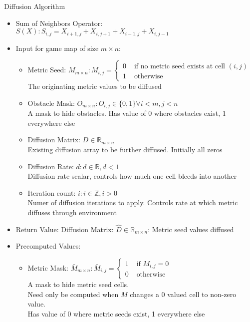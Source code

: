 \documentclass{beamer}
\begin{document}
\begin{frame}{Diffusion Algorithm}\fontsize{6pt}{7}\selectfont
 
 \begin{itemize}\fontsize{6pt}{7}\selectfont
  \item Sum of Neighbors Operator: \\$ S(X): S_{i,j} = X_{i+1,j} + X_{i,j+1} + X_{i-1,j} + X_{i,j-1} $
  \item Input for game map of size $m \times n$:
    \begin{itemize}\fontsize{6pt}{7}\selectfont
     \item Metric Seed: $M_{m \times n}: M_{i,j} = \left\{ \begin{array}{rl}
0 &\mbox{ if no metric seed exists at cell }(i,j) \\
1 &\mbox{ otherwise}
\end{array} \right.$ \\ The originating metric values to be diffused
     \item Obstacle Mask: $O_{m \times n}: O_{i,j} \in \{0,1\} \forall i<m, j<n$ \\ A mask to hide obstacles.  Has value of 0 where obstacles exist, 1 everywhere else
     \item Diffusion Matrix: $D\in \mathbb{R}_{m \times n}$ \\ Existing diffusion array to be further diffused.  Initially all zeros
     \item Diffusion Rate: $d: d \in \mathbb{R},  d < 1$ \\ Diffusion rate scalar, controls how much one cell bleeds into another
     \item Iteration count: $i: i \in \mathbb{Z}, i > 0$ \\ Numer of diffusion iterations to apply.  Controls rate at which metric diffuses through environment
    \end{itemize}
  \item Return Value: Diffusion Matrix: $\hat D \in \mathbb{R}_{m \times n}$: Metric seed values diffused
  \item Precomputed Values:
      \begin{itemize}\fontsize{6pt}{7}\selectfont
	\item Metric Mask: $\bar M_{m \times n}: \bar M_{i,j} =  \left\{ \begin{array}{rl}
1 &\mbox{ if $M_{i,j} = 0$} \\
0 &\mbox{ otherwise}
\end{array} \right.$ \\ A mask to hide metric seed cells.\\Need only be computed when $M$ changes a 0 valued cell to non-zero value.\\Has value of 0 where metric seeds exist, 1 everywhere else

\end{itemize}
\end{itemize}
\end{frame}
\end{document}
